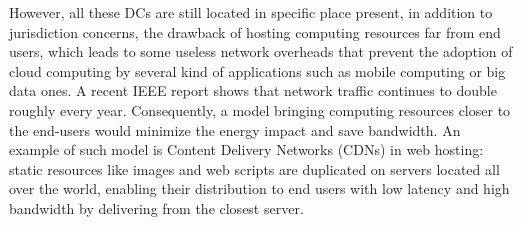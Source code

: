 However, all these DCs are still located in specific place present, in addition 
to jurisdiction concerns, the drawback of hosting computing resources far from 
end users, which leads to some useless network overheads that prevent the 
adoption of cloud computing by several kind of applications such as mobile 
computing or big data ones. A recent IEEE report \cite{ieeenetreport:2012}
shows that network traffic continues to double roughly every year. Consequently,
a model bringing computing resources closer to the end-users would minimize the 
energy impact and save bandwidth. An example of such model is Content Delivery 
Networks (CDNs) in web hosting: static resources like images and web scripts are
duplicated on servers located all over the world, enabling their distribution to
end users with low latency and high bandwidth by delivering from the closest 
server.

